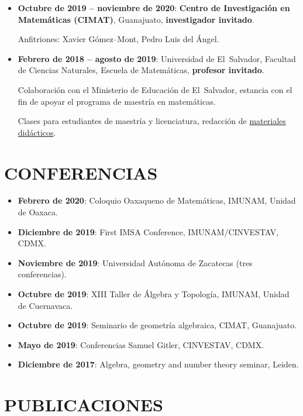 \documentclass{article}
\begin{document}
\begin{itemize}
\item \textbf{Octubre de 2019 -- noviembre de 2020}:
  \textbf{Centro de Investigación en Matemáticas (CIMAT)},
  Guanajuato, \textbf{investigador invitado}.

  Anfitriones: Xavier Gómez--Mont, Pedro Luis del Ángel.

\item \textbf{Febrero de 2018 -- agosto de 2019}:
  Universidad de El~Salvador,
  Facultad de Ciencias Naturales, Escuela de Matemáticas,
  \textbf{profesor invitado}.

  Colaboración con el Ministerio de Educación de El~Salvador,
  estancia con el fin de apoyar el programa de maestría en matemáticas.

  Clases para estudiantes de maestría y licenciatura, redacción de
  \href{https://cadadr.org/san-salvador/}{materiales didácticos}.
\end{itemize}

{\color{RoyalBlue}\section*{CONFERENCIAS}}

\begin{itemize}
\item \textbf{Febrero de 2020}: Coloquio Oaxaqueno de Matemáticas,
  IMUNAM, Unidad de Oaxaca.

\item \textbf{Diciembre de 2019}: First IMSA Conference,
  IMUNAM/CINVESTAV, CDMX.

\item \textbf{Noviembre de 2019}: Universidad Autónoma de Zacatecas
  (tres conferencias).

\item \textbf{Octubre de 2019}: XIII Taller de Álgebra y Topología,
  IMUNAM, Unidad de Cuernavaca.

\item \textbf{Octubre de 2019}: Seminario de geometría algebraica,
  CIMAT, Guanajuato.

\item \textbf{Mayo de 2019}: Conferencias Samuel Gitler,
  CINVESTAV, CDMX.

\item \textbf{Diciembre de 2017}:
  Algebra, geometry and number theory seminar, Leiden.
\end{itemize}

{\color{RoyalBlue}\section*{PUBLICACIONES}}
\end{document}
